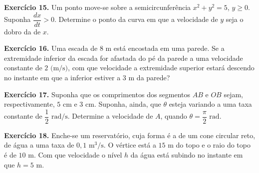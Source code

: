 \documentclass[12pt,a4paper]{article}
\begin{document}
\vspace{0.5cm}
\noindent\textbf{Exercício 15.}
Um ponto move-se sobre a semicircunferência $x^2 + y^2 = 5$, $y \ge 0$. Suponha $\dfrac{dx}{dt} > 0$. Determine o ponto da curva em que a velocidade de $y$ seja o dobro da de $x$.

\vspace{0.5cm}
\noindent\textbf{Exercício 16.}
Uma escada de $8\text{ m}$ está encostada em uma parede. Se a extremidade inferior da escada for afastada do pé da parede a uma velocidade constante de $2\text{ (m/s)}$, com que velocidade a extremidade superior estará descendo no instante em que a inferior estiver a $3\text{ m}$ da parede?

\vspace{0.5cm}
\noindent\textbf{Exercício 17.}
Suponha que os comprimentos dos segmentos $AB$ e $OB$ sejam, respectivamente, $5\text{ cm}$ e $3\text{ cm}$. Suponha, ainda, que $\theta$ esteja variando a uma taxa constante de $\dfrac{1}{2}\text{ rad/s}$. Determine a velocidade de $A$, quando $\theta = \dfrac{\pi}{2}\text{ rad}$.
\begin{center}
\end{center}

\vspace{0.5cm}
\noindent\textbf{Exercício 18.}
Enche-se um reservatório, cuja forma é a de um cone circular reto, de água a uma taxa de $0{,}1\text{ m}^3\text{/s}$. O vértice está a $15\text{ m}$ do topo e o raio do topo é de $10\text{ m}$. Com que velocidade o nível $h$ da água está subindo no instante em que $h = 5\text{ m}$.
\end{document}
